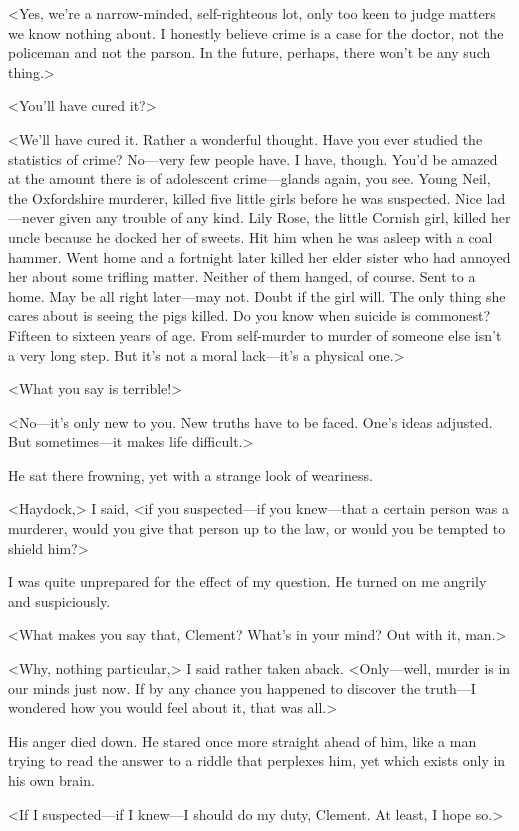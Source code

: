 <Yes, we're a narrow-minded, self-righteous lot, only too keen to judge matters we know nothing about. I honestly believe crime is a case for the doctor, not the policeman and not the parson. In the future, perhaps, there won't be any such thing.>

<You'll have cured it?>

<We'll have cured it. Rather a wonderful thought. Have you ever studied the statistics of crime? No—very few people have. I have, though. You'd be amazed at the amount there is of adolescent crime—glands again, you see. Young Neil, the Oxfordshire murderer, killed five little girls before he was suspected. Nice lad—never given any trouble of any kind. Lily Rose, the little Cornish girl, killed her uncle because he docked her of sweets. Hit him when he was asleep with a coal hammer. Went home and a fortnight later killed her elder sister who had annoyed her about some trifling matter. Neither of them hanged, of course. Sent to a home. May be all right later—may not. Doubt if the girl will. The only thing she cares about is seeing the pigs killed. Do you know when suicide is commonest? Fifteen to sixteen years of age. From self-murder to murder of someone else isn't a very long step. But it's not a moral lack—it's a physical one.>

<What you say is terrible!>

<No—it's only new to you. New truths have to be faced. One's ideas adjusted. But sometimes—it makes life difficult.>

He sat there frowning, yet with a strange look of weariness.

<Haydock,> I said, <if you suspected—if you knew—that a certain person was a murderer, would you give that person up to the law, or would you be tempted to shield him?>

I was quite unprepared for the effect of my question. He turned on me angrily and suspiciously.

<What makes you say that, Clement? What's in your mind? Out with it, man.>

<Why, nothing particular,> I said rather taken aback. <Only—well, murder is in our minds just now. If by any chance you happened to discover the truth—I wondered how you would feel about it, that was all.>

His anger died down. He stared once more straight ahead of him, like a man trying to read the answer to a riddle that perplexes him, yet which exists only in his own brain.

<If I suspected—if I knew—I should do my duty, Clement. At least, I hope so.>

